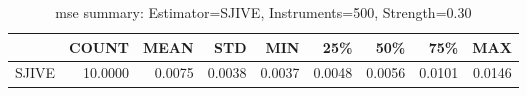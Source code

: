 \begin{table}[ht]
\centering
\caption{mse summary: Estimator=SJIVE, Instruments=500, Strength=0.30}
\begin{tabular}{lrrrrrrrr}
\toprule
 & COUNT & MEAN & STD & MIN & 25\% & 50\% & 75\% & MAX \\
\midrule
SJIVE & 10.0000 & 0.0075 & 0.0038 & 0.0037 & 0.0048 & 0.0056 & 0.0101 & 0.0146 \\
\bottomrule
\end{tabular}
\end{table}
